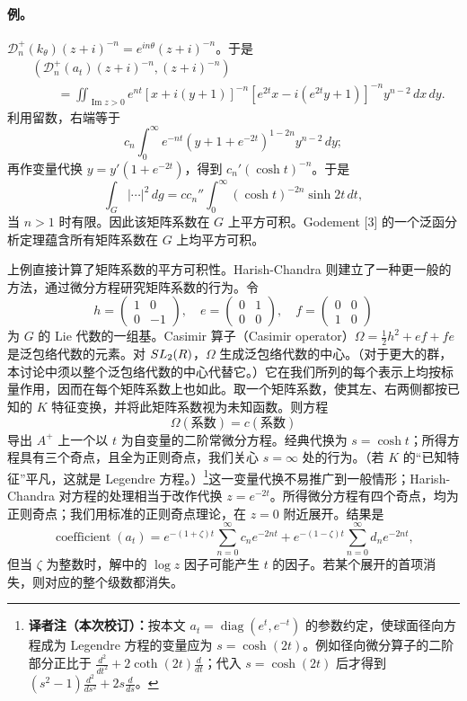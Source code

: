 \paragraph*{例。} $\mathcal D_n^+(k_\theta)(z+i)^{-n}=e^{in\theta}(z+i)^{-n}$。于是
\[
 \begin{split}
 &(\mathcal D_n^+(a_t)(z+i)^{-n},(z+i)^{-n})\\
 &\qquad=\iint_{\operatorname{Im}z>0}e^{nt}[x+i(y+1)]^{-n}
 [e^{2t}x-i(e^{2t}y+1)]^{-n}y^{n-2}\,dx\,dy.
 \end{split}
\]
利用留数，右端等于
\[
 c_n\int_0^\infty e^{-nt}(y+1+e^{-2t})^{1-2n}y^{n-2}\,dy;
\]
再作变量代换 $y=y'(1+e^{-2t})$，得到 $c_n'(\cosh t)^{-n}$。于是
\[
 \int_G|\cdots|^2\,dg=cc_n''\int_0^\infty(\cosh t)^{-2n}\sinh2t\,dt,
\]
当 $n>1$ 时有限。因此该矩阵系数在 $G$ 上平方可积。Godement [3] 的一个泛函分析定理蕴含所有矩阵系数在 $G$ 上均平方可积。

上例直接计算了矩阵系数的平方可积性。Harish-Chandra 则建立了一种更一般的方法，通过微分方程研究矩阵系数的行为。令
\[
 h=\begin{pmatrix}1&0\\0&-1\end{pmatrix},\quad
 e=\begin{pmatrix}0&1\\0&0\end{pmatrix},\quad
 f=\begin{pmatrix}0&0\\1&0\end{pmatrix}
\]
为 $G$ 的 Lie 代数的一组基。Casimir 算子（Casimir operator）$\Omega=\tfrac12h^2+ef+fe$ 是泛包络代数的元素。对 $SL_2(R)$，$\Omega$ 生成泛包络代数的中心。（对于更大的群，本讨论中须以整个泛包络代数的中心代替它。）它在我们所列的每个表示上均按标量作用，因而在每个矩阵系数上也如此。取一个矩阵系数，使其左、右两侧都按已知的 $K$ 特征变换，并将此矩阵系数视为未知函数。则方程
\[
 \Omega(\text{系数})=c(\text{系数})
\]
导出 $A^+$ 上一个以 $t$ 为自变量的二阶常微分方程。经典代换为 $s=\cosh t$；所得方程具有三个奇点，且全为正则奇点，我们关心 $s=\infty$ 处的行为。（若 $K$ 的“已知特征”平凡，这就是 Legendre 方程。）\footnote{\textbf{译者注（本次校订）：}按本文 $a_t=\operatorname{diag}(e^t,e^{-t})$ 的参数约定，使球面径向方程成为 Legendre 方程的变量应为 $s=\cosh(2t)$。例如径向微分算子的二阶部分正比于 $\frac{d^2}{dt^2}+2\coth(2t)\frac d{dt}$；代入 $s=\cosh(2t)$ 后才得到 $(s^2-1)\frac{d^2}{ds^2}+2s\frac d{ds}$。}这一变量代换不易推广到一般情形；Harish-Chandra 对方程的处理相当于改作代换 $z=e^{-2t}$。所得微分方程有四个奇点，均为正则奇点；我们用标准的正则奇点理论，在 $z=0$ 附近展开。结果是
\[
 \operatorname{coefficient}(a_t)=
 e^{-(1+\zeta)t}\sum_{n=0}^\infty c_ne^{-2nt}
 +e^{-(1-\zeta)t}\sum_{n=0}^\infty d_ne^{-2nt},
\]
但当 $\zeta$ 为整数时，解中的 $\log z$ 因子可能产生 $t$ 的因子。若某个展开的首项消失，则对应的整个级数都消失。

